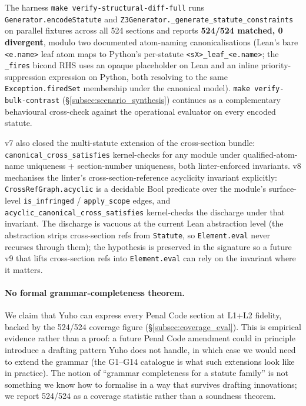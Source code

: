 The harness \texttt{make verify-structural-diff-full} runs
\texttt{Generator.encodeStatute} and
\texttt{Z3Generator.\_generate\_statute\_constraints} on parallel
fixtures across all 524 sections and reports
\textbf{524/524 matched, 0 divergent}, modulo two documented
atom-naming canonicalisations (Lean's bare \texttt{<e.name>}
leaf atom maps to Python's per-statute
\texttt{<sX>\_leaf\_<e.name>}; the \texttt{\_fires} bicond
RHS uses an opaque placeholder on Lean and an inline
priority-suppression expression on Python, both resolving to
the same \texttt{Exception.firedSet} membership under the
canonical model). \texttt{make verify-bulk-contrast}
(\S\ref{subsec:scenario_synthesis}) continues as a complementary
behavioural cross-check against the operational evaluator on
every encoded statute.

v7 also closed the multi-statute extension of the cross-section
bundle: \texttt{canonical\_cross\_satisfies} kernel-checks for
any module under qualified-atom-name uniqueness + section-number
uniqueness, both linter-enforced invariants. v8 mechanises the
linter's cross-section-reference acyclicity invariant
explicitly: \texttt{CrossRefGraph.acyclic} is a decidable Bool
predicate over the module's surface-level
\texttt{is\_infringed} / \texttt{apply\_scope} edges, and
\texttt{acyclic\_canonical\_cross\_satisfies} kernel-checks
the discharge under that invariant. The discharge is vacuous
at the current Lean abstraction level (the abstraction strips
cross-section refs from \texttt{Statute}, so
\texttt{Element.eval} never recurses through them); the
hypothesis is preserved in the signature so a future v9 that
lifts cross-section refs into \texttt{Element.eval} can rely
on the invariant where it matters.

\paragraph{No formal grammar-completeness theorem.} We claim that
Yuho can express every Penal Code section at L1+L2 fidelity,
backed by the 524/524 coverage figure (\S\ref{subsec:coverage_eval}).
This is empirical evidence rather than a proof: a future Penal Code
amendment could in principle introduce a drafting pattern Yuho does
not handle, in which case we would need to extend the grammar (the
G1--G14 catalogue is what such extensions look like in practice).
The notion of ``grammar completeness for a statute family'' is not
something we know how to formalise in a way that survives drafting
innovations; we report 524/524 as a coverage statistic rather than
a soundness theorem.
